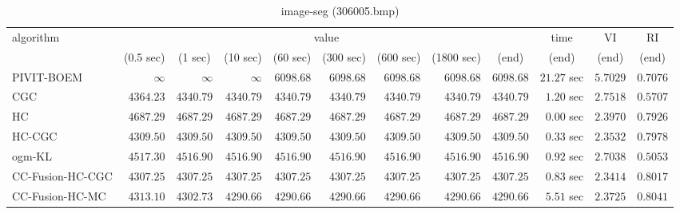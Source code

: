 \begin{table}[H]
\scriptsize
\centering
\caption{image-seg (306005.bmp)}
\label{tab:anytimetable-image-seg-306005.bmp}
\begin{tabular}{lrrrrrrrrrrr}
\toprule
           algorithm &                                   \multicolumn{8}{c}{value} & \multicolumn{1}{c}{time}    & \multicolumn{1}{c}{VI}  & \multicolumn{1}{c}{RI} \\  
\cmidrule(lr){2-9}\cmidrule(lr){10-10} \cmidrule(lr){11-11} \cmidrule(lr){12-12}   
                     & \multicolumn{1}{c}{(0.5 sec)} & \multicolumn{1}{c}{(1 sec)} & \multicolumn{1}{c}{(10 sec)} & \multicolumn{1}{c}{(60 sec)} & \multicolumn{1}{c}{(300 sec)} & \multicolumn{1}{c}{(600 sec)} & \multicolumn{1}{c}{(1800 sec)} & \multicolumn{1}{c}{(end)} & \multicolumn{1}{c}{(end)}    & \multicolumn{1}{c}{(end)}   & \multicolumn{1}{c}{(end)}  \\ \midrule 
          PIVIT-BOEM & $\infty$ & $\infty$ & $\infty$ & $      6098.68$ & $      6098.68$ & $      6098.68$ & $      6098.68$ & $      6098.68$ & $        21.27$ sec    & $       5.7029$  & $       0.7076$ \\ 
                 CGC & $      4364.23$ & $      4340.79$ & $      4340.79$ & $      4340.79$ & $      4340.79$ & $      4340.79$ & $      4340.79$ & $      4340.79$ & $         1.20$ sec    & $       2.7518$  & $       0.5707$ \\ 
                  HC & $      4687.29$ & $      4687.29$ & $      4687.29$ & $      4687.29$ & $      4687.29$ & $      4687.29$ & $      4687.29$ & $      4687.29$ & $         0.00$ sec    & $       2.3970$  & $       0.7926$ \\ 
              HC-CGC & $      4309.50$ & $      4309.50$ & $      4309.50$ & $      4309.50$ & $      4309.50$ & $      4309.50$ & $      4309.50$ & $      4309.50$ & $         0.33$ sec    & $       2.3532$  & $       0.7978$ \\ 
              ogm-KL & $      4517.30$ & $      4516.90$ & $      4516.90$ & $      4516.90$ & $      4516.90$ & $      4516.90$ & $      4516.90$ & $      4516.90$ & $         0.92$ sec    & $       2.7038$  & $       0.5053$ \\ 
    CC-Fusion-HC-CGC & $      4307.25$ & $      4307.25$ & $      4307.25$ & $      4307.25$ & $      4307.25$ & $      4307.25$ & $      4307.25$ & $      4307.25$ & $         0.83$ sec    & $       2.3414$  & $       0.8017$ \\ 
     CC-Fusion-HC-MC & $      4313.10$ & $      4302.73$ & $      4290.66$ & $      4290.66$ & $      4290.66$ & $      4290.66$ & $      4290.66$ & $      4290.66$ & $         5.51$ sec    & $       2.3725$  & $       0.8041$ \\ 

\end{tabular}
\end{table}
